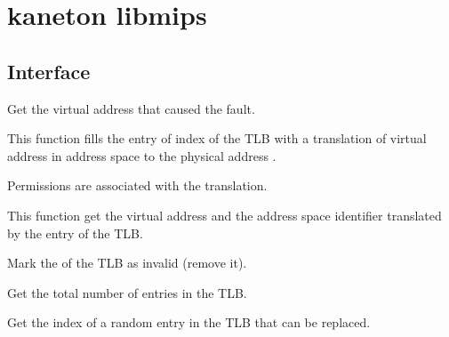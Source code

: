 \newpage

\section{kaneton libmips}

\subsection*{Interface}

{
  Get the virtual address that caused the fault.
}

{
  This function fills the entry of index  of the TLB
  with a translation of virtual address  in address
  space  to the physical address .

  Permissions  are associated with the translation.
}

{
  This function get the virtual address  and the
  address space identifier  translated by the entry
   of the TLB.
}

{
  Mark the  of the TLB as invalid (remove it).
}

{
  Get the total number of entries in the TLB.
}

{
  Get the index of a random entry in the TLB that can be replaced.
}


